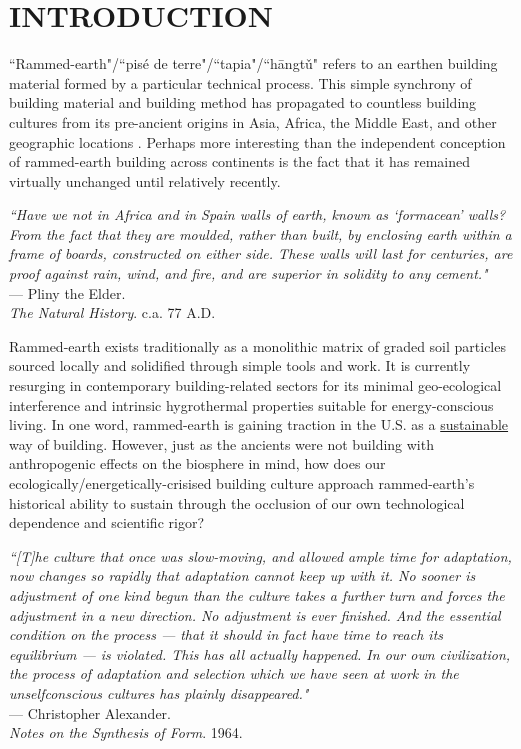 \section{INTRODUCTION}


``Rammed-earth"/``pis\'e de terre"/``tapia"/``h\=angt\v u" refers to an earthen building material formed by a particular technical process. This simple synchrony of building material and building method has propagated to countless building cultures from its pre-ancient origins in Asia, Africa, the Middle East, and other geographic locations \cite{RAMMEDEARTHHOUSE}. Perhaps more interesting than the independent conception of rammed-earth building across continents is the fact that it has remained virtually unchanged until relatively recently.

\begin{flushright}
\small{
\textit{``Have we not in Africa and in Spain walls of earth, known as `formacean' walls? From the fact that they are moulded, rather than built, by enclosing earth within a frame of boards, constructed on either side. These walls will last for centuries, are proof against rain, wind, and fire, and are superior in solidity to any cement."}}\\ --- Pliny the Elder. \\ \textit{The Natural History}. c.a. 77 A.D.
\end{flushright}

Rammed-earth exists traditionally as a monolithic matrix of graded soil particles sourced locally and solidified through simple tools and work. It is currently resurging in contemporary building-related sectors for its minimal geo-ecological interference and intrinsic hygrothermal properties suitable for energy-conscious living. In one word, rammed-earth is gaining traction in the U.S. as a \underline{sustainable} way of building. However, just as the ancients were not building with anthropogenic effects on the biosphere in mind, how does our ecologically/energetically-crisised building culture approach rammed-earth's historical ability to sustain through the occlusion of our own technological dependence and scientific rigor?

\begin{flushright}
\small{
\textit{``[T]he culture that once was slow-moving, and allowed ample time for adaptation, now changes so rapidly that adaptation cannot keep up with it. No sooner is adjustment of one kind begun than the culture takes a further turn and forces the adjustment in a new direction. No adjustment is ever finished. And the essential condition on the process --- that it should in fact have time to reach its equilibrium --- is violated. This has all actually happened. In our own civilization, the process of adaptation and selection which we have seen at work in the unselfconscious cultures has plainly disappeared."}}\\ --- Christopher Alexander. \\ \textit{Notes on the Synthesis of Form}. 1964.
\end{flushright}

